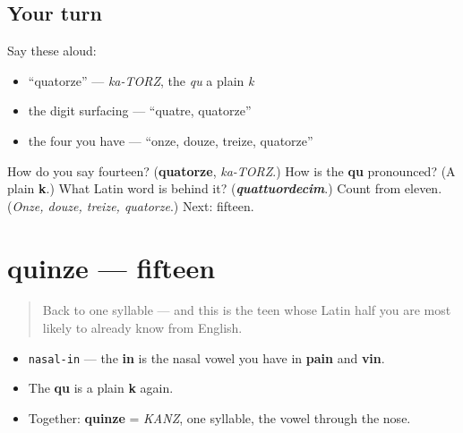 \subsection*{Your turn}
Say these aloud:

\begin{itemize}
\raggedright
  \item \textquotedblleft{}quatorze\textquotedblright{} — \emph{ka-TORZ}, the \emph{qu} a plain \emph{k}
  \item the digit surfacing — \textquotedblleft{}quatre, quatorze\textquotedblright{}
  \item the four you have — \textquotedblleft{}onze, douze, treize, quatorze\textquotedblright{}
\end{itemize}

\begin{tcolorbox}[breakable,colback=teal!4,colframe=teal!35!black,title={Before you move on}]
How do you say fourteen? (\textbf{quatorze}, \emph{ka-TORZ}.) How is the \textbf{qu} pronounced? (A plain \textbf{k}.) What Latin word is behind it? (\emph{\textbf{quattuordecim}}.) Count from eleven. (\emph{Onze, douze, treize, quatorze}.) Next: fifteen.
\end{tcolorbox}
\section[quinze]{quinze — fifteen}

\label{lesson:FR-C12-quinze}



\begin{quote}
Back to one syllable — and this is the teen whose Latin half you are most likely to already know from English.
\end{quote}

\begin{sounds}
\begin{itemize}
\raggedright
  \item \texttt{nasal-in} — the \textbf{in} is the nasal vowel you have in \textbf{pain} and \textbf{vin}.
  \item The \textbf{qu} is a plain \textbf{k} again.
  \item Together: \textbf{quinze} = \emph{KANZ}, one syllable, the vowel through the nose.
\end{itemize}
\end{sounds}


